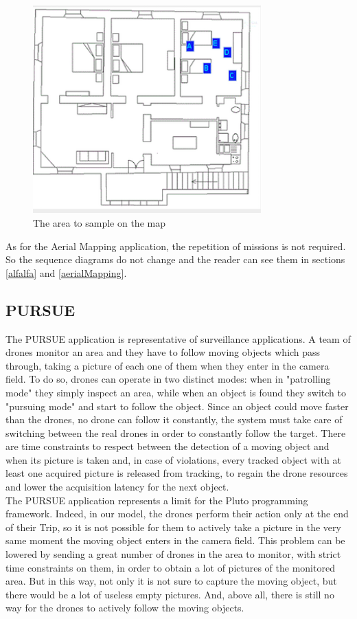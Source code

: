 \begin{figure}[H]
\centering
\includegraphics[width=\linewidth, height=8cm]{pictures/pm10Area.png}
\caption{The area to sample on the map}
\label{fig:pm10Area}
\end{figure}

As for the Aerial Mapping\cite{putti} application, the repetition of missions is not required.
So the sequence diagrams do not change and the reader can see them in sections \ref{alfalfa} and \ref{aerialMapping}.


\subsection{PURSUE}\label{PURSUE}


The PURSUE application\cite{pursue} is representative of surveillance applications. A team of drones monitor an area and they have to follow moving objects which pass through, taking a picture of each one of them when they enter in the camera field.
To do so, drones can operate in two distinct modes: when in "patrolling mode" they simply inspect an area, while when an object is found they switch to "pursuing mode" and start to follow the object.
Since an object could move faster than the drones, no drone can follow it constantly, the system must take care of switching between the real drones in order to constantly follow the target.
There are time constraints to respect between the detection of a moving object and when its picture is taken and, in case of violations, every tracked object with at least one acquired picture is released from tracking, to regain the drone resources and lower the acquisition latency for the next object.
\\

The PURSUE application represents a limit for the Pluto programming framework.
Indeed, in our model, the drones perform their action only at the end of their Trip, so it is not possible for them to actively take a picture in the very same moment the moving object enters in the camera field.
This problem can be lowered by sending a great number of drones in the area to monitor, with strict time constraints on them, in order to obtain a lot of pictures of the monitored area.
But in this way, not only it is not sure to capture the moving object, but there would be a lot of useless empty pictures.
And, above all, there is still no way for the drones to actively follow the moving objects.

